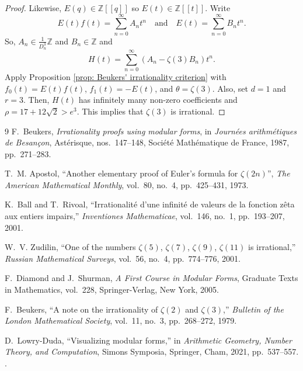 \documentclass[12pt, a4paper]{amsart}
\theoremstyle{definition}
\numberwithin{theorem}{section}
\begin{document}
\begin{proof}
Likewise, $E\left(q\right)\in \mathbb{Z}\left[\left[q\right]\right]$ so $E\left(t\right)\in\mathbb{Z}\left[\left[t\right]\right]$. Write \[E\left(t\right)f\left(t\right)=\sum_{n=0}^{\infty}A_nt^n\quad\text{and}\quad E\left(t\right)=\sum_{n=0}^{\infty}B_nt^n.\]
So, $A_n\in \frac{1}{D_n^3}\mathbb{Z}$ and $B_n\in\mathbb{Z}$ and \[H\left(t\right)=\sum_{n=0}^{\infty}\left(A_n-\zeta\left(3\right)B_n\right)t^n.\]
Apply Proposition \ref{prop: Beukers' irrationality criterion} with $f_0\left(t\right)=E\left(t\right)f\left(t\right)$, $f_1\left(t\right)=-E\left(t\right)$, and $\theta=\zeta\left(3\right)$. Also, set $d=1$ and $r=3$. Then, $H\left(t\right)$ has infinitely many non-zero coefficients and $\rho=17+12\sqrt{2}>e^3$. This implies that $\zeta\left(3\right)$ is irrational.
\end{proof}
\begin{thebibliography}{9}
F.~Beukers, \emph{Irrationality proofs using modular forms}, in \emph{Journ\'ees arithm\'etiques de Besan\c{c}on}, Ast\'erisque, nos.~147--148, Soci\'et\'e Math\'ematique de France, 1987, pp.~271--283.

T.~M. Apostol, ``Another elementary proof of Euler's formula for $\zeta\left(2n\right)$'', \emph{The American Mathematical Monthly}, vol.~80, no.~4, pp.~425--431, 1973.

K.~Ball and T.~Rivoal, ``Irrationalit\'e d'une infinit\'e de valeurs de la fonction z\^eta aux entiers impairs,'' \emph{Inventiones Mathematicae}, vol.~146, no.~1, pp.~193--207, 2001.

W.~V. Zudilin, ``One of the numbers $\zeta\left(5\right)$, $\zeta\left(7\right)$, $\zeta\left(9\right)$, $\zeta\left(11\right)$ is irrational,'' \emph{Russian Mathematical Surveys}, vol.~56, no.~4, pp.~774--776, 2001.

F.~Diamond and J.~Shurman, \emph{A First Course in Modular Forms}, Graduate Texts in Mathematics, vol.~228, Springer-Verlag, New York, 2005.

F.~Beukers, ``A note on the irrationality of $\zeta\left(2\right)$ and $\zeta\left(3\right)$,'' \emph{Bulletin of the London Mathematical Society}, vol.~11, no.~3, pp.~268--272, 1979.

D.~Lowry-Duda, ``Visualizing modular forms,'' in \emph{Arithmetic Geometry, Number Theory, and Computation}, Simons Symposia, Springer, Cham, 2021, pp.~537--557. .


\end{thebibliography}
\end{document}
